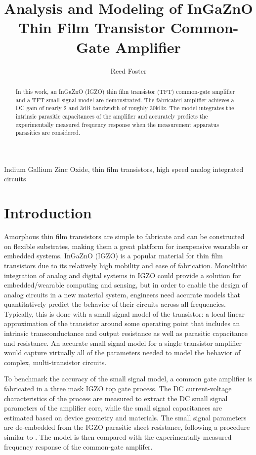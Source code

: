\documentclass[conference]{IEEEtran}
\begin{document}
\title{Analysis and Modeling of InGaZnO Thin Film Transistor Common-Gate Amplifier}

\author{Reed Foster}

\maketitle

\begin{abstract}
    In this work, an InGaZnO (IGZO) thin film transistor (TFT) common-gate amplifier and a TFT small signal model are demonstrated.
    The fabricated amplifier achieves a DC gain of nearly 2 and 3dB bandwidth of roughly 30kHz.
    The model integrates the intrinsic parasitic capacitances of the amplifier and accurately predicts the experimentally measured frequency response when the measurement apparatus parasitics are considered.
\end{abstract}

\begin{IEEEkeywords}
    Indium Gallium Zinc Oxide, thin film transistors, high speed analog integrated circuits
\end{IEEEkeywords}

\section{Introduction}
Amorphous thin film transistors are simple to fabricate and can be constructed on flexible substrates, making them a great platform for inexpensive wearable or embedded systems.
InGaZnO (IGZO) is a popular material for thin film transistors due to its relatively high mobility and ease of fabrication\cite{Nomura}.
Monolithic integration of analog and digital systems in IGZO could provide a solution for embedded/wearable computing and sensing,
but in order to enable the design of analog circuits in a new material system,
engineers need accurate models that quantitatively predict the behavior of their circuits across all frequencies.
Typically, this is done with a small signal model of the transistor: a local linear approximation of the transistor around some operating point that includes an intrinsic transconductance and output resistance as well as parasitic capacitance and resistance.
An accurate small signal model for a single transistor amplifier would capture virtually all of the parameters needed to model the behavior of complex, multi-transistor circuits.

To benchmark the accuracy of the small signal model, a common gate amplifier is fabricated in a three mask IGZO top gate process.
The DC current-voltage characteristics of the process are measured to extract the DC small signal parameters of the amplifier core, while the small signal capacitances are estimated based on device geometry and materials.
The small signal parameters are de-embedded from the IGZO parasitic sheet resistance, following a procedure similar to \cite{Cheng}.
The model is then compared with the experimentally measured frequency response of the common-gate amplifer.
\end{document}
